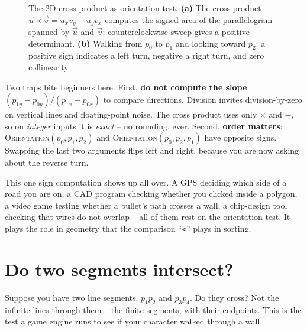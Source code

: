 \begin{figure}[H]
\caption{The 2D cross product as orientation test. \textbf{(a)} The cross product
$\vec{u}\times\vec{v} = u_x v_y - u_y v_x$ computes the signed area of the
parallelogram spanned by $\vec{u}$ and $\vec{v}$; counterclockwise sweep gives a
positive determinant. \textbf{(b)} Walking from $p_0$ to $p_1$ and looking toward
$p_2$: a positive sign indicates a left turn, negative a right turn, and zero
collinearity.}
\label{ch32:fig-orientation}
\end{figure}

\begin{trapbox}
Two traps bite beginners here. First, \textbf{do not compute the slope}
$(p_{1y}-p_{0y})/(p_{1x}-p_{0x})$ to compare directions. Division invites
division-by-zero on vertical lines and floating-point noise. The cross product
uses only $\times$ and $-$, so on \emph{integer} inputs it is \emph{exact} -- no
rounding, ever. Second, \textbf{order matters}: \textsc{Orientation}$(p_0,p_1,p_2)$
and \textsc{Orientation}$(p_0,p_2,p_1)$ have opposite signs. Swapping the last two
arguments flips left and right, because you are now asking about the reverse turn.
\end{trapbox}

\begin{aestheticbox}
This one sign computation shows up all over. A GPS deciding which side of a road
you are on, a CAD program checking whether you clicked inside a polygon, a video
game testing whether a bullet's path crosses a wall, a chip-design tool checking
that wires do not overlap -- all of them rest on the orientation test. It plays
the role in geometry that the comparison ``\texttt{<}'' plays in sorting.
\end{aestheticbox}

\section{Do two segments intersect?}

Suppose you have two line segments, $\overline{p_1 p_2}$ and
$\overline{p_3 p_4}$. Do they cross? Not the infinite lines through them -- the
finite segments, with their endpoints. This is the test a game engine runs to see
if your character walked through a wall.

